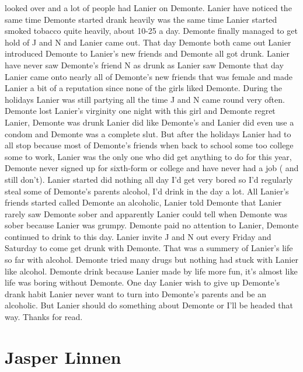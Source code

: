 \documentclass[12pt]{book}
\begin{document}
looked over and a lot of people had Lanier on Demonte. Lanier have noticed the same time Demonte started drank heavily was the same time Lanier started smoked tobacco quite heavily, about 10-25 a day. Demonte finally managed to get hold of J and N and Lanier came out. That day Demonte both came out Lanier introduced Demonte to Lanier's new friends and Demonte all got drunk. Lanier have never saw Demonte's friend N as drunk as Lanier saw Demonte that day Lanier came onto nearly all of Demonte's new friends that was female and made Lanier a bit of a reputation since none of the girls liked Demonte. During the holidays Lanier was still partying all the time J and N came round very often. Demonte lost Lanier's virginity one night with this girl and Demonte regret Lanier, Demonte was drunk Lanier did like Demonte's and Lanier did even use a condom and Demonte was a complete slut. But after the holidays Lanier had to all stop because most of Demonte's friends when back to school some too college some to work, Lanier was the only one who did get anything to do for this year, Demonte never signed up for sixth-form or college and have never had a job ( and still don't). Lanier started did nothing all day I'd get very bored so I'd regularly steal some of Demonte's parents alcohol, I'd drink in the day a lot. All Lanier's friends started called Demonte an alcoholic, Lanier told Demonte that Lanier rarely saw Demonte sober and apparently Lanier could tell when Demonte was sober because Lanier was grumpy. Demonte paid no attention to Lanier, Demonte continued to drink to this day. Lanier invite J and N out every Friday and Saturday to come get drunk with Demonte. That was a summery of Lanier's life so far with alcohol. Demonte tried many drugs but nothing had stuck with Lanier like alcohol. Demonte drink because Lanier made by life more fun, it's almost like life was boring without Demonte. One day Lanier wish to give up Demonte's drank habit Lanier never want to turn into Demonte's parents and be an alcoholic. But Lanier should do something about Demonte or I'll be headed that way. Thanks for read.



\chapter{Jasper Linnen}
\end{document}
